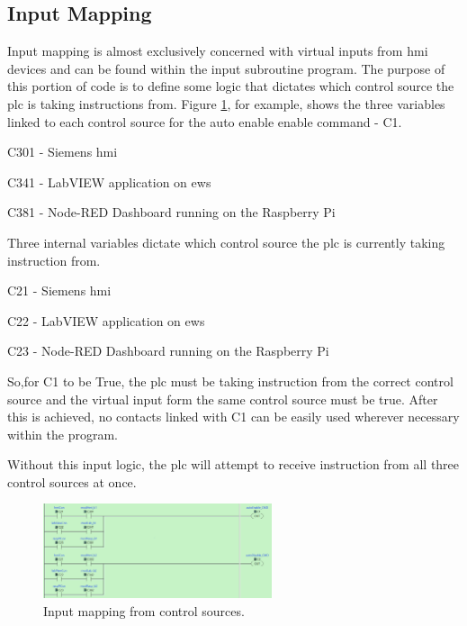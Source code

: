     \subsection{Input Mapping} \label{sec:input}
        Input mapping is almost exclusively concerned with virtual inputs from \acrshort{hmi} devices and can be found within the input subroutine program. The purpose of this portion of code is to define some logic that dictates which control source the \acrshort{plc} is taking instructions from. Figure \ref{fig:inputMapping}, for example, shows the three variables linked to each control source for the auto enable enable command - C1.
        \begin{description}
            \item C301 - Siemens \acrshort{hmi}
            \item C341 - LabVIEW application on \acrshort{ews} 
            \item C381 - Node-RED Dashboard running on the Raspberry Pi
        \end{description}
        
        Three internal variables dictate which control source the \acrshort{plc} is currently taking instruction from.
        \begin{description}
            \item C21 - Siemens \acrshort{hmi}
            \item C22 - LabVIEW application on \acrshort{ews}
            \item C23 - Node-RED Dashboard running on the Raspberry Pi
        \end{description} 
        So,for C1 to be True, the \acrshort{plc} must be taking instruction from the correct control source and the virtual input form the same control source must be true. After this is achieved, \acrshort{no} contacts linked with C1 can be easily used wherever necessary within the program. 

        Without this input logic, the \acrshort{plc} will attempt to receive instruction from all three control sources at once.
        
        \begin{figure}[H]
            \centering
            \includegraphics[width = 0.6\textwidth]{2_images/inputMapping}
            \caption{Input mapping from control sources.}
            \label{fig:inputMapping}
        \end{figure}
        
